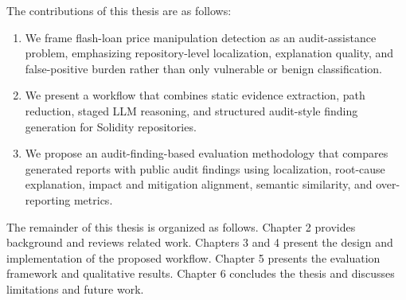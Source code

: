 The contributions of this thesis are as follows:
\begin{enumerate}
    \item We frame flash-loan price manipulation detection as an
    audit-assistance problem, emphasizing repository-level localization,
    explanation quality, and false-positive burden rather than only vulnerable
    or benign classification.

    \item We present a workflow that combines static evidence
    extraction, path reduction, staged LLM reasoning, and structured
    audit-style finding generation for Solidity repositories.

    \item We propose an audit-finding-based evaluation methodology that
    compares generated reports with public audit findings using localization,
    root-cause explanation, impact and mitigation alignment, semantic
    similarity, and over-reporting metrics.
\end{enumerate}

The remainder of this thesis is organized as follows. Chapter 2 provides
background and reviews related work. Chapters 3 and 4 present the design and
implementation of the proposed workflow. Chapter 5 presents the evaluation
framework and qualitative results. Chapter 6 concludes the thesis and
discusses limitations and future work.
